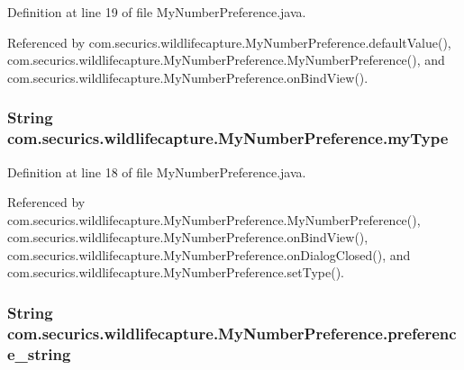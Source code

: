 Definition at line 19 of file My\+Number\+Preference.\+java.



Referenced by com.\+securics.\+wildlifecapture.\+My\+Number\+Preference.\+default\+Value(), com.\+securics.\+wildlifecapture.\+My\+Number\+Preference.\+My\+Number\+Preference(), and com.\+securics.\+wildlifecapture.\+My\+Number\+Preference.\+on\+Bind\+View().

\subsubsection[{my\+Type}]{\setlength{\rightskip}{0pt plus 5cm}String com.\+securics.\+wildlifecapture.\+My\+Number\+Preference.\+my\+Type\hspace{0.3cm}{\ttfamily [private]}}\label{classcom_1_1securics_1_1wildlifecapture_1_1_my_number_preference_aae6a127ad2be3196f1c4bf0b3590b6d5}


Definition at line 18 of file My\+Number\+Preference.\+java.



Referenced by com.\+securics.\+wildlifecapture.\+My\+Number\+Preference.\+My\+Number\+Preference(), com.\+securics.\+wildlifecapture.\+My\+Number\+Preference.\+on\+Bind\+View(), com.\+securics.\+wildlifecapture.\+My\+Number\+Preference.\+on\+Dialog\+Closed(), and com.\+securics.\+wildlifecapture.\+My\+Number\+Preference.\+set\+Type().

\subsubsection[{preference\+\_\+string}]{\setlength{\rightskip}{0pt plus 5cm}String com.\+securics.\+wildlifecapture.\+My\+Number\+Preference.\+preference\+\_\+string\hspace{0.3cm}{\ttfamily [private]}}\label{classcom_1_1securics_1_1wildlifecapture_1_1_my_number_preference_a203d22dff492d3707c55f9c9b66a683a}


